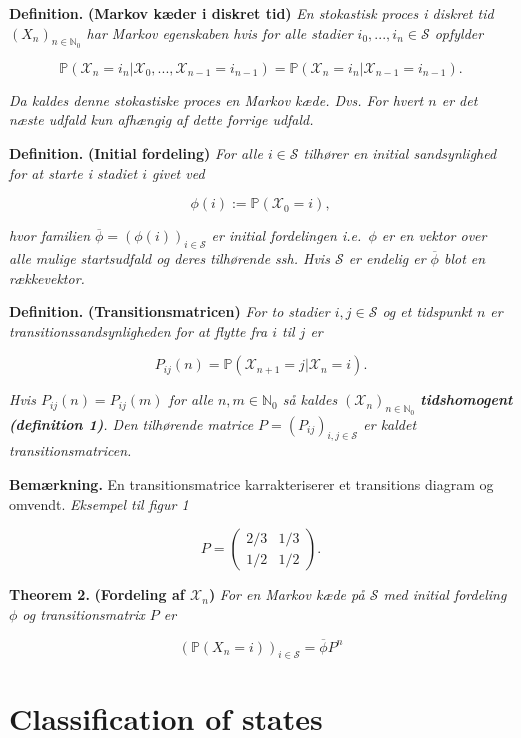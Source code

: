 \documentclass[
]{book}
\begin{document}
\textbf{Definition.} \textbf{(Markov kæder i diskret tid)} \emph{En stokastisk proces i diskret tid \((X_n)_{n\in\mathbb{N}_0}\) har \textit{Markov egenskaben} hvis for alle stadier \(i_0,...,i_n\in\mathcal{S}\) opfylder}

\[
\mathbb{P}(\mathcal{X}_n=i_n\vert \mathcal{X}_0,...,\mathcal{X}_{n-1}=i_{n-1})=\mathbb{P}(\mathcal{X}_n=i_n \vert \mathcal{X}_{n-1}=i_{n-1}).
\]

\emph{Da kaldes denne stokastiske proces en Markov kæde. Dvs. For hvert \(n\) er det næste udfald kun afhængig af dette forrige udfald.}

\textbf{Definition.} \textbf{(Initial fordeling)} \emph{For alle \(i\in\mathcal{S}\) tilhører en initial sandsynlighed for at starte i stadiet \(i\) givet ved}

\[
\phi(i):=\mathbb{P}(\mathcal{X}_0=i),
\]

\emph{hvor familien \(\overline{\phi}=(\phi(i))_{i\in\mathcal{S}}\) er initial fordelingen i.e.~\(\phi\) er en vektor over alle mulige startsudfald og deres tilhørende ssh. Hvis \(\mathcal{S}\) er endelig er \(\overline{\phi}\) blot en rækkevektor.}

\textbf{Definition.} \textbf{(Transitionsmatricen)} \emph{For to stadier \(i,j\in\mathcal{S}\) og et tidspunkt \(n\) er transitionssandsynligheden for at flytte fra \(i\) til \(j\) er}

\[
P_{ij}(n)=\mathbb{P}(\mathcal{X}_{n+1}=j \vert \mathcal{X}_n=i).
\]

\emph{Hvis \(P_{ij}(n)=P_{ij}(m)\) for alle \(n,m\in\mathbb{N}_0\) så kaldes \((\mathcal{X}_n)_{n\in\mathbb{N}_0}\) \textbf{tidshomogent (definition 1)}. Den tilhørende matrice \(P=(P_{ij})_{i,j\in\mathcal{S}}\) er kaldet transitionsmatricen.}

\textbf{Bemærkning.} En transitionsmatrice karrakteriserer et transitions diagram og omvendt. \textit{Eksempel til figur 1}

\[
P=\begin{pmatrix}
2/3 & 1/3\\
1/2 & 1/2
\end{pmatrix}.
\]

\textbf{Theorem 2.} \textbf{(Fordeling af \(\mathcal{X}_n\))} \emph{For en Markov kæde på \(\mathcal{S}\) med initial fordeling \(\phi\) og transitionsmatrix \(P\) er}

\[
(\mathbb{P}(X_n=i))_{i\in\mathcal{S}}=\overline{\phi} P^n
\]

\hypertarget{classification-of-states}{%
\section{Classification of states}\label{classification-of-states}}
\end{document}
